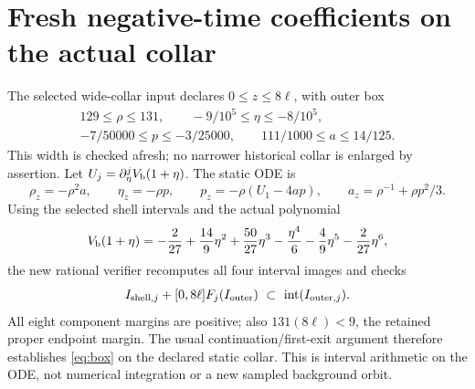 \documentclass[11pt]{article}
\begin{document}
\section{Fresh negative-time coefficients on the actual collar}
\label{sec:coeff}
The selected wide-collar input declares $0\le z\le8\ell$, with outer box
\begin{equation}
\begin{gathered}
 129\le\rho\le131,\qquad -9/10^5\le\eta\le-8/10^5,\\
 -7/50000\le p\le-3/25000,\qquad
 111/1000\le a\le14/125.
\end{gathered}
\label{eq:box}
\end{equation}
This width is checked afresh; no narrower historical collar is enlarged
by assertion. Let $U_j=\partial_\eta^j V_{\rm b}(1+\eta)$. The static ODE is
\begin{equation}
 \rho_z=-\rho^2a,\qquad \eta_z=-\rho p,\qquad
 p_z=-\rho(U_1-4ap),\qquad a_z=\rho^{-1}+\rho p^2/3 .
 \label{eq:ode}
\end{equation}
Using the selected shell intervals and the actual polynomial
\begin{equation}
 V_{\rm b}(1+\eta)=-\frac2{27}+\frac{14}{9}\eta^2
   +\frac{50}{27}\eta^3-\frac{\eta^4}{6}
   -\frac49\eta^5-\frac2{27}\eta^6 ,
\end{equation}
the new rational verifier recomputes all four interval images and checks
\[
 I_{{\rm shell},j}+[0,8\ell]F_j(I_{\rm outer})
       \ \subset\ {\rm int}(I_{{\rm outer},j}) .
\]
All eight component margins are positive; also $131(8\ell)<9$, the
retained proper endpoint margin. The usual continuation/first-exit argument
therefore establishes \eqref{eq:box} on the declared static collar.
This is interval arithmetic on the ODE, not numerical integration or a
new sampled background orbit.
\end{document}
